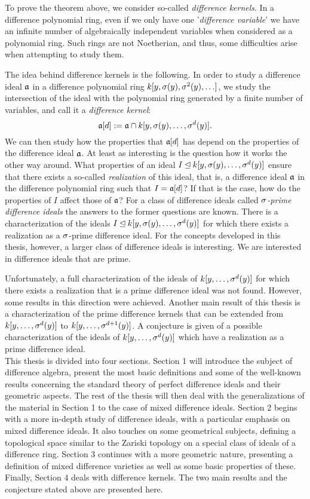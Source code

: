 To prove the theorem above, we consider so-called \emph{difference kernels}.
In a difference polynomial ring, even if we only have one '\emph{difference variable}' we have an infinite number of algebraically independent variables when considered as a polynomial ring. Such rings are not Noetherian, and thus, some difficulties arise when attempting to study them. 

The idea behind difference kernels is the following.
In order to study a difference ideal $\mathfrak{a}$ in a difference polynomial ring $k[y,\sigma(y),\sigma^2(y),\ldots]$,
we study the intersection of the ideal with the polynomial ring generated by a finite number of variables, and call it a \emph{difference kernel}: $$\mathfrak{a}[d] := \mathfrak{a} \cap k[y,\sigma(y),\ldots,\sigma^d(y)].$$
We can then study how the properties that $\mathfrak{a}[d]$ has depend on the properties of the difference ideal $\mathfrak{a}$. At least as interesting is the question how it works the other way around.
What properties of an ideal $I \unlhd k[y,\sigma(y),\ldots,\sigma^d(y)]$ ensure that there exists a so-called \emph{realization} of this ideal, that is, a difference ideal $\mathfrak{a}$ in the difference polynomial ring such that $I = \mathfrak{a}[d]$?
 If that is the case, how do the properties of $I$ affect those of $\mathfrak{a}$?
For a class of difference ideals called \emph{$\sigma$-prime difference ideals} the answers to the former questions are known. 
There is a characterization of the ideals $I \unlhd k[y,\sigma(y),\ldots,\sigma^d(y)]$ for which there exists a realization as a $\sigma$-prime difference ideal. 
For the concepts developed in this thesis, however, a larger class of difference ideals is interesting. We are interested in difference ideals that are prime. 

Unfortunately, a full characterization of the ideals of $k[y,\ldots,\sigma^d(y)]$ for which there exists a realization that is a prime difference ideal was not found. However, some results in this direction were achieved. Another main result of this thesis is a characterization of the prime difference kernels that 
can be extended from $k[y,\ldots,\sigma^d(y)]$ to $k[y,\ldots,\sigma^{d+1}(y)]$. A conjecture is given of a possible characterization of the ideals of $k[y,\ldots,\sigma^d(y)]$
which have a realization as a prime difference ideal. \\


This thesis is divided into four sections. Section 1 will introduce the subject of difference algebra, present the most basic definitions and some of the well-known results concerning the standard theory of perfect difference ideals and their geometric aspects.
The rest of the thesis will then deal with the generalizations of the material in Section 1 to the case of mixed difference ideals.
Section 2 begins with a more in-depth study of difference ideals, with a particular emphasis on mixed difference ideals. It also touches on some geometrical subjects, defining a topological space similar to the Zariski topology on a special class of ideals of a difference ring.
Section 3 continues with a more geometric nature, presenting a definition of mixed difference varieties as well as some basic properties of these. 
Finally, Section 4 deals with difference kernels. The two main results and the conjecture stated above are presented here.
